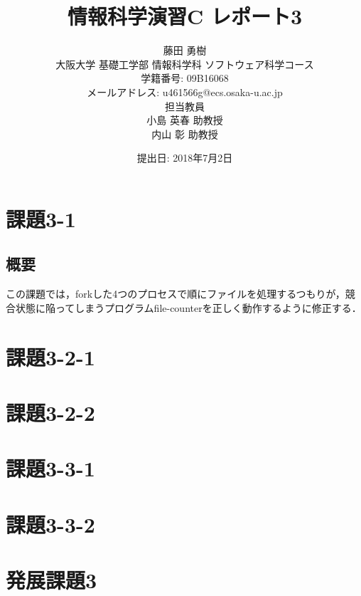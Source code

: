 \documentclass[a4j,10pt,titlepage]{jsarticle}
\title{情報科学演習C レポート3}
\author{藤田 勇樹 \\
大阪大学 基礎工学部 情報科学科 ソフトウェア科学コース\\
学籍番号: 09B16068 \\
メールアドレス: u461566g@ecs.osaka-u.ac.jp \\
担当教員\\
小島 英春 助教授 \\
内山 彰 助教授}
\date{提出日: 2018年7月2日}
\begin{document}
\maketitle
\section{課題3-1}
\subsection{概要}
この課題では，forkした4つのプロセスで順にファイルを処理するつもりが，競合状態に陥ってしまうプログラムfile-counterを正しく動作するように修正する．



\section{課題3-2-1}
\section{課題3-2-2}
\section{課題3-3-1}
\section{課題3-3-2}
\section{発展課題3}
\end{document}
